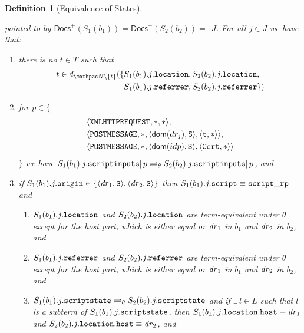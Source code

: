 \documentclass[letterpaper,onecolumn,10pt]{article}
\newtheorem{definition}{Definition}
\begin{document}
\begin{definition}[Equivalence of States]
\begin{enumerate}
\begin{enumerate}
      pointed to by $\mathsf{Docs}^+(S_1(b_1)) = \mathsf{Docs}^+(S_2(b_2)) =: J$. 
      For all $j \in J$ we have that: \label{eqs:b:w}
      \begin{enumerate}
      \item there is no $t \in T$ such that
        \begin{align*}
          t \in d_{\nonces \setminus \{t\}}(\{&S_1(b_1).j.\str{location}
          ,  S_2(b_2).j.\str{location},\\ & S_1(b_1).j.\str{referrer} , 
          S_2(b_2).j.\str{referrer}\})
        \end{align*}
      \item for $p \in \{$
        \begin{align*}
          & \langle\mathtt{XMLHTTPREQUEST},*,*\rangle,\\
          & \langle\mathtt{POSTMESSAGE},*,\langle\mathsf{dom}(dr_j), \mathtt{S}\rangle,\langle\mathtt{t}, *\rangle\rangle,\\
          & \langle\mathtt{POSTMESSAGE},*,\langle\mathsf{dom}(idp), \mathtt{S}\rangle,\langle\mathtt{Cert}, *\rangle\rangle
        \end{align*}
        $\}$ we have
        $S_1(b_1).j.\mathtt{scriptinputs} |\, p \rightleftharpoons_{\theta}
        S_2(b_2).j.\mathtt{scriptinputs} |\, p$, and
      \item\label{eqs:b:w:script_rp} if
        $S_1(b_1).j.\mathtt{origin} \in \{\langle\mathit{dr}_1, \mathtt{S}\rangle,\langle\mathit{dr}_2, \mathtt{S}\rangle\}$
        then $S_1(b_1).j.\mathtt{script} \equiv \mathtt{script\_rp}$ and \
        \begin{enumerate}
        \item $S_1(b_1).j.\mathtt{location}$ and $S_2(b_2).j.\mathtt{location}$
          are term-equivalent under $\theta$ except for the host part,
          which is either equal or $\mathit{dr}_1$ in $b_1$ and $\mathit{dr}_2$ in
          $b_2$, and
        \item $S_1(b_1).j.\mathtt{referrer}$ and $S_2(b_2).j.\mathtt{referrer}$
          are term-equivalent under $\theta$ except for the host part,
          which is either equal or $\mathit{dr}_1$ in $b_1$ and $\mathit{dr}_2$ in
          $b_2$, and
        \item
          $S_1(b_1).j.\mathtt{scriptstate} \rightleftharpoons_{\theta}
          S_2(b_2).j.\mathtt{scriptstate}$ and if $\exists\, l \in L$ such that $l$ is a subterm of $S_1(b_1).j.\mathtt{scriptstate}$, then $S_1(b_1).j.\mathtt{location}.\mathtt{host} \equiv \mathit{dr}_1$ and $S_2(b_2).j.\mathtt{location}.\mathtt{host} \equiv \mathit{dr}_2$, and

\end{enumerate}
\end{enumerate}
\end{enumerate}
\end{enumerate}
\end{definition}
\end{document}
